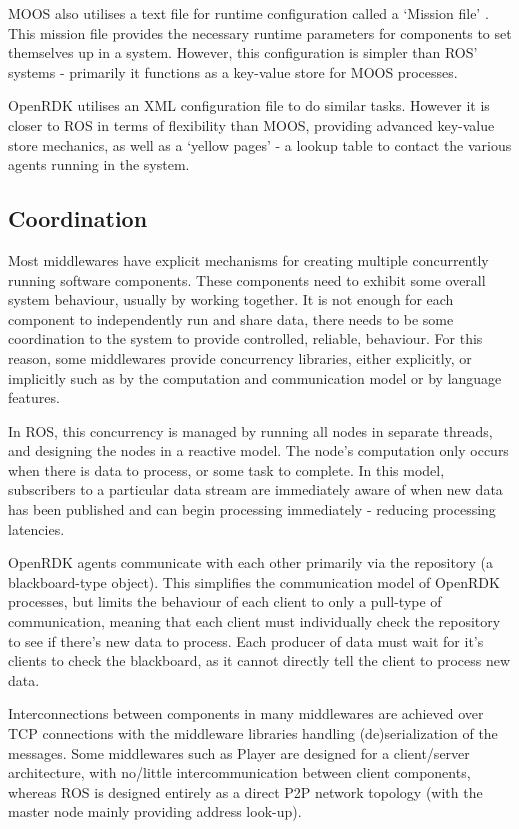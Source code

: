\documentclass[../dissertation.tex]{subfiles}
\begin{document}
MOOS also utilises a text file for runtime configuration called a `Mission file' \cite{newman2009introduction}. This mission file provides the necessary runtime parameters for components to set themselves up in a system. However, this configuration is simpler than ROS' systems - primarily it functions as a key-value store for MOOS processes.

OpenRDK utilises an XML configuration file to do similar tasks. However it is closer to ROS in terms of flexibility than MOOS, providing advanced key-value store mechanics, as well as a `yellow pages' - a lookup table to contact the various agents running in the system.

\subsection{Coordination}
\label{coordination-section}

Most middlewares have explicit mechanisms for creating multiple concurrently running software components. These components need to exhibit some overall system behaviour, usually by working together. It is not enough for each component to independently run and share data, there needs to be some coordination to the system to provide controlled, reliable, behaviour. For this reason, some middlewares provide concurrency libraries, either explicitly, or implicitly such as by the computation and communication model or by language features.

In ROS, this concurrency is managed by running all nodes in separate threads, and designing the nodes in a reactive model. The node's computation only occurs when there is data to process, or some task to complete. In this model, subscribers to a particular data stream are immediately aware of when new data has been published and can begin processing immediately - reducing processing latencies.

OpenRDK agents communicate with each other primarily via the repository (a blackboard-type object). This simplifies the communication model of OpenRDK processes, but limits the behaviour of each client to only a pull-type of communication, meaning that each client must individually check the repository to see if there's new data to process. Each producer of data must wait for it's clients to check the blackboard, as it cannot directly tell the client to process new data.

Interconnections between components in many middlewares are achieved over TCP connections with the middleware libraries handling (de)serialization of the messages. Some middlewares such as Player are designed for a client/server architecture, with no/little intercommunication between client components, whereas ROS is designed entirely as a direct P2P network topology (with the master node mainly providing address look-up).
\end{document}
